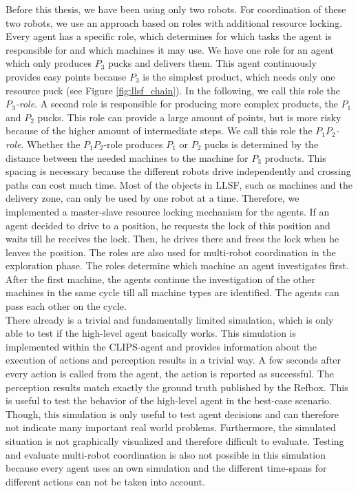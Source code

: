 Before this thesis, we have been using only two robots. For coordination of these two robots, we use an approach based on roles with additional resource locking. Every agent has a specific role, which determines for which tasks the agent is responsible for and which machines it may use. We have one role for an agent which only produces $P_3$ pucks and delivers them. This agent continuously provides easy points because $P_3$ is the simplest product, which needs only one resource puck (see Figure \ref{fig:llsf_chain}). In the following, we call this role the \textit{$P_3$-role}. A second role is responsible for producing  more complex products, the $P_1$ and $P_2$ pucks. This role can provide a large amount of points, but is more risky because of the higher amount of intermediate steps. We call this role the \textit{$P_1P_2$-role}. Whether the $P_1P_2$-role produces $P_1$ or $P_2$ pucks is determined by the distance between the needed machines to the machine for $P_3$ products. This spacing is necessary because the different robots drive independently and crossing paths can cost much time. Most of the objects in LLSF, such as machines and the delivery zone, can only be used by one robot at a time. Therefore, we implemented a master-slave resource locking mechanism for the agents. If an agent decided to drive to a position, he requests the lock of this position and waits till he receives the lock. Then, he drives there and frees the lock when he leaves the position. The roles are also used for multi-robot coordination in the exploration phase. The roles determine which machine an agent investigates first. After the first machine, the agents continue the investigation of the other machines in the same cycle till all machine types are identified. The agents can pass each other on the cycle.\\
There already is a trivial and fundamentally limited simulation, which is only able to test if the high-level agent basically works. This simulation is implemented within the CLIPS-agent and provides information about the execution of actions and perception results in a trivial way. A few seconds after every action is called from the agent, the action is reported as successful. The perception results match exactly the ground truth published by the Refbox. This is useful to test the behavior of the high-level agent in the best-case scenario. Though, this simulation is only useful to test agent decisions and can therefore not indicate many important real world problems. Furthermore, the simulated situation is not graphically visualized and therefore difficult to evaluate. Testing and evaluate multi-robot coordination is also not possible in this simulation because every agent uses an own simulation and the different time-spans for different actions can not be taken into account.

